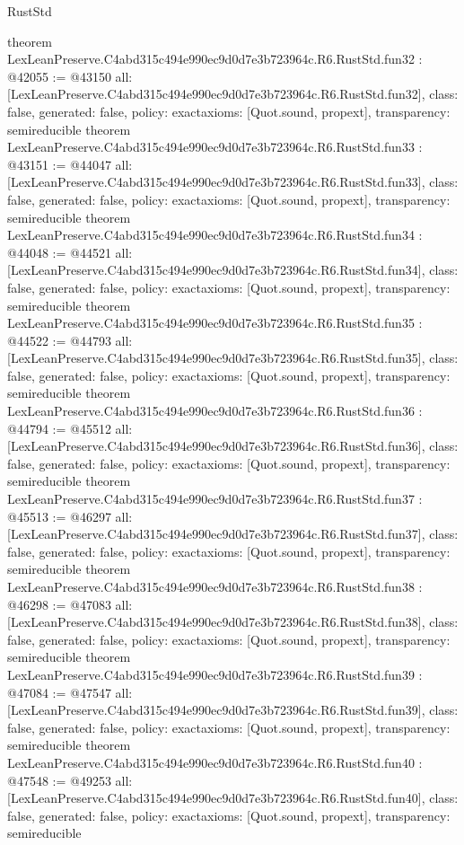 \begin{lexlean}{RustStd}
\begin{coremodule}
{}
theorem LexLeanPreserve.C4abd315c494e990ec9d0d7e3b723964c.R6.RustStd.fun32 : @42055 := @43150 {
  all: [LexLeanPreserve.C4abd315c494e990ec9d0d7e3b723964c.R6.RustStd.fun32],
  class: false,
  generated: false,
  policy: exact{axioms: [Quot.sound, propext]},
  transparency: semireducible
}
theorem LexLeanPreserve.C4abd315c494e990ec9d0d7e3b723964c.R6.RustStd.fun33 : @43151 := @44047 {
  all: [LexLeanPreserve.C4abd315c494e990ec9d0d7e3b723964c.R6.RustStd.fun33],
  class: false,
  generated: false,
  policy: exact{axioms: [Quot.sound, propext]},
  transparency: semireducible
}
theorem LexLeanPreserve.C4abd315c494e990ec9d0d7e3b723964c.R6.RustStd.fun34 : @44048 := @44521 {
  all: [LexLeanPreserve.C4abd315c494e990ec9d0d7e3b723964c.R6.RustStd.fun34],
  class: false,
  generated: false,
  policy: exact{axioms: [Quot.sound, propext]},
  transparency: semireducible
}
theorem LexLeanPreserve.C4abd315c494e990ec9d0d7e3b723964c.R6.RustStd.fun35 : @44522 := @44793 {
  all: [LexLeanPreserve.C4abd315c494e990ec9d0d7e3b723964c.R6.RustStd.fun35],
  class: false,
  generated: false,
  policy: exact{axioms: [Quot.sound, propext]},
  transparency: semireducible
}
theorem LexLeanPreserve.C4abd315c494e990ec9d0d7e3b723964c.R6.RustStd.fun36 : @44794 := @45512 {
  all: [LexLeanPreserve.C4abd315c494e990ec9d0d7e3b723964c.R6.RustStd.fun36],
  class: false,
  generated: false,
  policy: exact{axioms: [Quot.sound, propext]},
  transparency: semireducible
}
theorem LexLeanPreserve.C4abd315c494e990ec9d0d7e3b723964c.R6.RustStd.fun37 : @45513 := @46297 {
  all: [LexLeanPreserve.C4abd315c494e990ec9d0d7e3b723964c.R6.RustStd.fun37],
  class: false,
  generated: false,
  policy: exact{axioms: [Quot.sound, propext]},
  transparency: semireducible
}
theorem LexLeanPreserve.C4abd315c494e990ec9d0d7e3b723964c.R6.RustStd.fun38 : @46298 := @47083 {
  all: [LexLeanPreserve.C4abd315c494e990ec9d0d7e3b723964c.R6.RustStd.fun38],
  class: false,
  generated: false,
  policy: exact{axioms: [Quot.sound, propext]},
  transparency: semireducible
}
theorem LexLeanPreserve.C4abd315c494e990ec9d0d7e3b723964c.R6.RustStd.fun39 : @47084 := @47547 {
  all: [LexLeanPreserve.C4abd315c494e990ec9d0d7e3b723964c.R6.RustStd.fun39],
  class: false,
  generated: false,
  policy: exact{axioms: [Quot.sound, propext]},
  transparency: semireducible
}
theorem LexLeanPreserve.C4abd315c494e990ec9d0d7e3b723964c.R6.RustStd.fun40 : @47548 := @49253 {
  all: [LexLeanPreserve.C4abd315c494e990ec9d0d7e3b723964c.R6.RustStd.fun40],
  class: false,
  generated: false,
  policy: exact{axioms: [Quot.sound, propext]},
  transparency: semireducible
}
\end{coremodule}
\end{lexlean}
